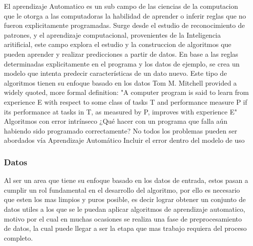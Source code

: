 \documentclass[a4paper,10pt]{article}
\begin{document}
El aprendizaje Automatico es un sub campo de las ciencias de la computacion que le otorga a las computadoras la habilidad de aprender o inferir reglas que no fueron explicitamente programadas.
Surge desde el estudio de reconocimiento de patrones, y el aprendizaje computacional, provenientes de la Inteligencia aritificial, este campo explora el estudio y la construccion de algoritmos
que pueden aprender y realizar predicciones a partir de datos. En base a las reglas determinadas explicitamente en el programa y los datos de ejemplo, se crea un modelo que intenta predecir
características de un dato nuevo. Este tipo de algoritmos tienen su enfoque basado en los datos
Tom M. Mitchell provided a widely quoted, more formal definition: "A computer program is said to learn from experience E with respect to some class of tasks T and 
performance measure P if its performance at tasks in T, as measured by P, improves with experience E"
Algoritmos con error intrínseco
¿Qué hacer con un programa que falla aún habiendo sido programado correctamente?
No todos los problemas pueden ser abordados vía Aprendizaje Automático
Incluir el error dentro del modelo de uso

\subsubsection{Datos}
Al ser un area que tiene su enfoque basado en los datos de entrada, estos pasan a cumplir un rol fundamental en el desarrollo del algoritmo, por ello es necesario que 
esten los mas limpios y puros posible, es decir lograr obtener un conjunto de datos utiles a los que se le puedan aplicar algoritmos de aprendizaje automatico, 
motivo por el cual en muchas ocasiones se realiza una fase de preprocesamiento de datos, la cual puede llegar a ser la etapa que mas trabajo requiera del proceso completo. 
\end{document}

